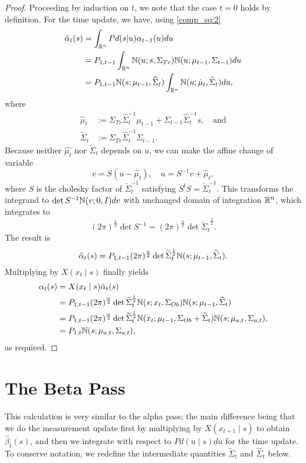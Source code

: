 \documentclass[12pt,leqno]{article}
\begin{document}
\begin{proof}

Proceeding by induction on $t$, we note that the case $t = 0$ holds by definition.
For the time update, we have, using \eqref{comp_sq:2}
\begin{align}
  \hat{\alpha}_t(s) &= \int_{{\mathbb R}^n}Pd(s|u)\alpha_{t-1}(u)du \\\notag
  &= P_{1,t-1}\int_{{\mathbb R}^n}{\mathbb N}(u;s,\Sigma_{Tr}){\mathbb N}(u;\mu_{t-1},\Sigma_{t-1})du \notag\\
  &= P_{1,t-1}{\mathbb N}(s;\mu_{t-1},\widehat{\Sigma}_t)\int_{{\mathbb R}^n}{\mathbb N}(u;\hat{\mu}_t,
  \widetilde{\Sigma}_t) du,
\end{align}
where
 \begin{align*}
  \hat{\mu}_t &:= \Sigma_{Tr}\widehat{\Sigma}_t^{-1}\mu_{t-1} +
  \Sigma_{t-1}\widehat{\Sigma}_t^{-1}s, \quad\text{and}\\
  \widetilde{\Sigma}_t &:= \Sigma_{Tr}\widehat{\Sigma}_t^{-1}\Sigma_{t-1}.
  \end{align*}
Because neither $\hat{\mu_t}$ nor $\widetilde{\Sigma}_t$ depends on $u$, we can
make the affine change of variable
$$
v = S(u-\hat{\mu}_t),\quad u = S^{-1}v+\hat{\mu}_t,
$$
where $S$ is the cholesky factor of $\widetilde{\Sigma}_t^{-1}$ satisfying
$S^tS = \widetilde{\Sigma}_t^{-1}$. This transforms the integrand to
  $\det{S}^{-1}{\mathbb N}(v;0,I)dv$
with unchanged domain of integration ${\mathbb R}^n$, which integrates to
$$
(2\pi)^{\frac{n}{2}}\det{S}^{-1} = (2\pi)^{\frac{n}{2}}\det{\widetilde{\Sigma}_t}^{\frac{1}{2}}.
$$
The result is
$$
\hat{\alpha}_t(s) = P_{1,t-1}(2\pi)^{\frac{n}{2}}\det{\widetilde{\Sigma}_t}^{\frac{1}{2}}
{\mathbb N}(s;\mu_{t-1},\widehat{\Sigma}_t).
$$
Multiplying by $X(x_t\mid s)$ finally yields
\begin{align*}
  \alpha_t(s) &= X(x_t\mid s)\hat{\alpha}_t(s) \\
  &= P_{1,t-1}(2\pi)^{\frac{n}{2}}\det{\widetilde{\Sigma}_t}^{\frac{1}{2}}
  {\mathbb N}(s;x_t,\Sigma_{Ob}){\mathbb N}(s;\mu_{t-1},\widehat{\Sigma}_t) \\
  &= P_{1,t-1}(2\pi)^{\frac{n}{2}}\det{\widetilde{\Sigma}_t}^{\frac{1}{2}}
  {\mathbb N}(x_t;\mu_{t-1},\Sigma_{Ob} + \widehat{\Sigma}_t){\mathbb N}(s;\mu_{a,t},\Sigma_{a,t}), \\
  &= P_{1,t}{\mathbb N}(s;\mu_{a,t},\Sigma_{a,t}),
\end{align*}
as required.
\end{proof}

\section{The Beta Pass}
This calculation is very similar to the alpha pass; the main difference being that we do
the measurement update first by multiplying by $X(x_{t+1}\mid s)$ to obtain $\hat{\beta}_t(s)$,
and then we integrate with respect to $Pd(u\mid s)du$ for the time update.  To conserve notation,
we redefine the intermediate quantities $\widetilde{\Sigma}_t$ and $\widehat{\Sigma}_t$ below.
\end{document}
